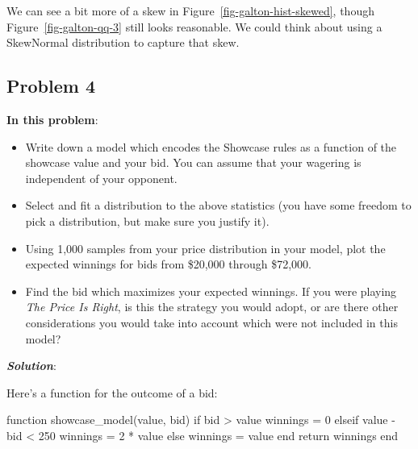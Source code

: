 \documentclass[
  letterpaper,
  DIV=11,
  numbers=noendperiod]{scrartcl}
\newenvironment{Shaded}{\begin{snugshade}}{\end{snugshade}}
\newcommand{\ControlFlowTok}[1]{\textcolor[rgb]{0.00,0.23,0.31}{#1}}
\newcommand{\FloatTok}[1]{\textcolor[rgb]{0.68,0.00,0.00}{#1}}
\newcommand{\FunctionTok}[1]{\textcolor[rgb]{0.28,0.35,0.67}{#1}}
\newcommand{\KeywordTok}[1]{\textcolor[rgb]{0.00,0.23,0.31}{#1}}
\newcommand{\NormalTok}[1]{\textcolor[rgb]{0.00,0.23,0.31}{#1}}
\newcommand{\OperatorTok}[1]{\textcolor[rgb]{0.37,0.37,0.37}{#1}}
\providecommand{\tightlist}{%
  \setlength{\itemsep}{0pt}\setlength{\parskip}{0pt}}\usepackage{longtable,booktabs,array}
\begin{document}
We can see a bit more of a skew in Figure~\ref{fig-galton-hist-skewed},
though Figure~\ref{fig-galton-qq-3} still looks reasonable. We could
think about using a SkewNormal distribution to capture that skew.

\subsection{Problem 4}\label{problem-4}

\textbf{In this problem}:

\begin{itemize}
\tightlist
\item
  Write down a model which encodes the Showcase rules as a function of
  the showcase value and your bid. You can assume that your wagering is
  independent of your opponent.
\item
  Select and fit a distribution to the above statistics (you have some
  freedom to pick a distribution, but make sure you justify it).
\item
  Using 1,000 samples from your price distribution in your model, plot
  the expected winnings for bids from \$20,000 through \$72,000.
\item
  Find the bid which maximizes your expected winnings. If you were
  playing \emph{The Price Is Right}, is this the strategy you would
  adopt, or are there other considerations you would take into account
  which were not included in this model?
\end{itemize}

\textbf{\emph{Solution}}:

Here's a function for the outcome of a bid:

\begin{Shaded}
\begin{Highlighting}[]
\KeywordTok{function} \FunctionTok{showcase\_model}\NormalTok{(value, bid)}
    \ControlFlowTok{if}\NormalTok{ bid }\OperatorTok{\textgreater{}}\NormalTok{ value}
\NormalTok{        winnings }\OperatorTok{=} \FloatTok{0}
    \ControlFlowTok{elseif}\NormalTok{ value }\OperatorTok{{-}}\NormalTok{ bid }\OperatorTok{\textless{}} \FloatTok{250}
\NormalTok{        winnings }\OperatorTok{=} \FloatTok{2} \OperatorTok{*}\NormalTok{ value}
    \ControlFlowTok{else}
\NormalTok{        winnings }\OperatorTok{=}\NormalTok{ value}
    \ControlFlowTok{end}
    \ControlFlowTok{return}\NormalTok{ winnings}
\KeywordTok{end}
\end{Highlighting}
\end{Shaded}
\end{document}
